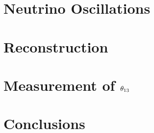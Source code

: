 \documentclass{ucbthesis}
\begin{document}
\listoftodos

\chapter{Neutrino Oscillations}





\chapter{Reconstruction}






\chapter{Measurement of \texorpdfstring{$\theta_{13}$}{theta13}}

\chapter{Conclusions}

\printbibliography

\appendix


\end{document}
